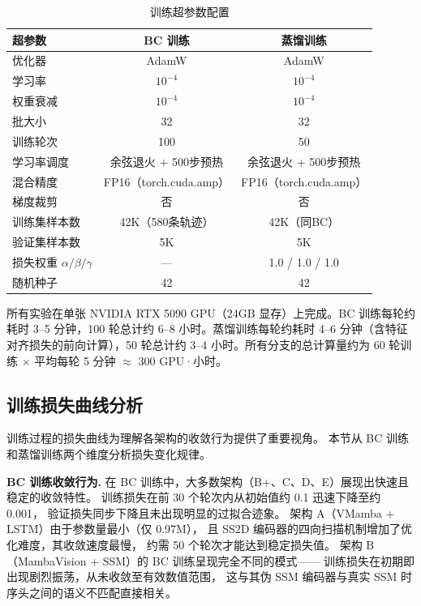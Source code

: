 \documentclass[12pt,a4paper]{article}
\numberwithin{equation}{section}
\numberwithin{figure}{section}
\numberwithin{table}{section}
\begin{document}
\begin{table}[H]
\centering
\caption{训练超参数配置}
\label{tab:app_hparams}
\begin{tabular}{lcc}
\toprule
\textbf{超参数} & \textbf{BC 训练} & \textbf{蒸馏训练} \\
\midrule
优化器 & AdamW & AdamW \\
学习率 & $10^{-4}$ & $10^{-4}$ \\
权重衰减 & $10^{-4}$ & $10^{-4}$ \\
批大小 & 32 & 32 \\
训练轮次 & 100 & 50 \\
学习率调度 & 余弦退火 + 500步预热 & 余弦退火 + 500步预热 \\
混合精度 & FP16（torch.cuda.amp） & FP16（torch.cuda.amp） \\
梯度裁剪 & 否 & 否 \\
训练集样本数 & 42K（580条轨迹） & 42K（同BC） \\
验证集样本数 & 5K & 5K \\
损失权重 $\alpha / \beta / \gamma$ & --- & 1.0 / 1.0 / 1.0 \\
随机种子 & 42 & 42 \\
\bottomrule
\end{tabular}
\end{table}

\noindent 所有实验在单张 NVIDIA RTX 5090 GPU（24GB 显存）上完成。BC 训练每轮约耗时 3--5 分钟，100 轮总计约 6--8 小时。蒸馏训练每轮约耗时 4--6 分钟（含特征对齐损失的前向计算），50 轮总计约 3--4 小时。所有分支的总计算量约为 60 轮训练 $\times$ 平均每轮 5 分钟 $\approx$ 300 GPU·小时。

\subsection{训练损失曲线分析}
\label{app:loss_curves}

训练过程的损失曲线为理解各架构的收敛行为提供了重要视角。
本节从 BC 训练和蒸馏训练两个维度分析损失变化规律。

\textbf{BC 训练收敛行为.}
在 BC 训练中，大多数架构（B+、C、D、E）展现出快速且稳定的收敛特性。
训练损失在前 30 个轮次内从初始值约 0.1 迅速下降至约 0.001，
验证损失同步下降且未出现明显的过拟合迹象。
架构 A（VMamba + LSTM）由于参数量最小（仅 0.97M），
且 SS2D 编码器的四向扫描机制增加了优化难度，其收敛速度最慢，
约需 50 个轮次才能达到稳定损失值。
架构 B（MambaVision + SSM）的 BC 训练呈现完全不同的模式——
训练损失在初期即出现剧烈振荡，从未收敛至有效数值范围，
这与其伪 SSM 编码器与真实 SSM 时序头之间的语义不匹配直接相关。
\end{document}
